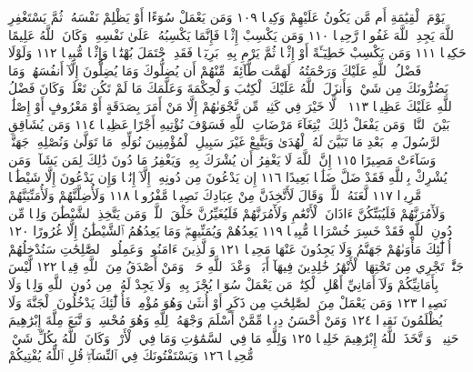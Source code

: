 يَوْمَ ٱلْقِيَٰمَةِ أَم مَّن يَكُونُ عَلَيْهِمْ وَكِيلࣰا ١٠٩ وَمَن يَعْمَلْ
سُوٓءًا أَوْ يَظْلِمْ نَفْسَهُۥ ثُمَّ يَسْتَغْفِرِ ٱللَّهَ يَجِدِ ٱللَّهَ غَفُورࣰا
رَّحِيمࣰا ١١٠ وَمَن يَكْسِبْ إِثْمࣰا فَإِنَّمَا يَكْسِبُهُۥ عَلَىٰ نَفْسِهِۦۚ
وَكَانَ ٱللَّهُ عَلِيمًا حَكِيمࣰا ١١١ وَمَن يَكْسِبْ خَطِيٓـَٔةً أَوْ إِثْمࣰا
ثُمَّ يَرْمِ بِهِۦ بَرِيٓـࣰٔا فَقَدِ ٱحْتَمَلَ بُهْتَٰنࣰا وَإِثْمࣰا مُّبِينࣰا ١١٢
وَلَوْلَا فَضْلُ ٱللَّهِ عَلَيْكَ وَرَحْمَتُهُۥ لَهَمَّت طَّآئِفَةࣱ مِّنْهُمْ
أَن يُضِلُّوكَ وَمَا يُضِلُّونَ إِلَّآ أَنفُسَهُمْۖ وَمَا يَضُرُّونَكَ
مِن شَيْءࣲۚ وَأَنزَلَ ٱللَّهُ عَلَيْكَ ٱلْكِتَٰبَ وَٱلْحِكْمَةَ وَعَلَّمَكَ
مَا لَمْ تَكُن تَعْلَمُۚ وَكَانَ فَضْلُ ٱللَّهِ عَلَيْكَ عَظِيمࣰا ١١٣
۞ لَّا خَيْرَ فِي كَثِيرࣲ مِّن نَّجْوَىٰهُمْ إِلَّا مَنْ أَمَرَ بِصَدَقَةٍ
أَوْ مَعْرُوفٍ أَوْ إِصْلَٰحِۭ بَيْنَ ٱلنَّاسِۚ وَمَن يَفْعَلْ ذَٰلِكَ
ٱبْتِغَآءَ مَرْضَاتِ ٱللَّهِ فَسَوْفَ نُؤْتِيهِ أَجْرًا عَظِيمࣰا ١١٤ وَمَن
يُشَاقِقِ ٱلرَّسُولَ مِنۢ بَعْدِ مَا تَبَيَّنَ لَهُ ٱلْهُدَىٰ وَيَتَّبِعْ غَيْرَ
سَبِيلِ ٱلْمُؤْمِنِينَ نُوَلِّهِۦ مَا تَوَلَّىٰ وَنُصْلِهِۦ جَهَنَّمَۖ وَسَآءَتْ
مَصِيرًا ١١٥ إِنَّ ٱللَّهَ لَا يَغْفِرُ أَن يُشْرَكَ بِهِۦ وَيَغْفِرُ مَا دُونَ
ذَٰلِكَ لِمَن يَشَآءُۚ وَمَن يُشْرِكْ بِٱللَّهِ فَقَدْ ضَلَّ ضَلَٰلَۢا
بَعِيدًا ١١٦ إِن يَدْعُونَ مِن دُونِهِۦٓ إِلَّآ إِنَٰثࣰا وَإِن يَدْعُونَ
إِلَّا شَيْطَٰنࣰا مَّرِيدࣰا ١١٧ لَّعَنَهُ ٱللَّهُۘ وَقَالَ لَأَتَّخِذَنَّ مِنْ
عِبَادِكَ نَصِيبࣰا مَّفْرُوضࣰا ١١٨ وَلَأُضِلَّنَّهُمْ وَلَأُمَنِّيَنَّهُمْ
وَلَأٓمُرَنَّهُمْ فَلَيُبَتِّكُنَّ ءَاذَانَ ٱلْأَنْعَٰمِ وَلَأٓمُرَنَّهُمْ
فَلَيُغَيِّرُنَّ خَلْقَ ٱللَّهِۚ وَمَن يَتَّخِذِ ٱلشَّيْطَٰنَ وَلِيࣰّا مِّن
دُونِ ٱللَّهِ فَقَدْ خَسِرَ خُسْرَانࣰا مُّبِينࣰا ١١٩ يَعِدُهُمْ
وَيُمَنِّيهِمْۖ وَمَا يَعِدُهُمُ ٱلشَّيْطَٰنُ إِلَّا غُرُورًا ١٢٠ أُو۟لَٰٓئِكَ
مَأْوَىٰهُمْ جَهَنَّمُ وَلَا يَجِدُونَ عَنْهَا مَحِيصࣰا ١٢١
وَٱلَّذِينَ ءَامَنُوا۟ وَعَمِلُوا۟ ٱلصَّٰلِحَٰتِ سَنُدْخِلُهُمْ جَنَّٰتࣲ
تَجْرِي مِن تَحْتِهَا ٱلْأَنْهَٰرُ خَٰلِدِينَ فِيهَآ أَبَدࣰاۖ وَعْدَ ٱللَّهِ
حَقࣰّاۚ وَمَنْ أَصْدَقُ مِنَ ٱللَّهِ قِيلࣰا ١٢٢ لَّيْسَ بِأَمَانِيِّكُمْ
وَلَآ أَمَانِيِّ أَهْلِ ٱلْكِتَٰبِۗ مَن يَعْمَلْ سُوٓءࣰا يُجْزَ بِهِۦ
وَلَا يَجِدْ لَهُۥ مِن دُونِ ٱللَّهِ وَلِيࣰّا وَلَا نَصِيرࣰا ١٢٣ وَمَن
يَعْمَلْ مِنَ ٱلصَّٰلِحَٰتِ مِن ذَكَرٍ أَوْ أُنثَىٰ وَهُوَ مُؤْمِنࣱ
فَأُو۟لَٰٓئِكَ يَدْخُلُونَ ٱلْجَنَّةَ وَلَا يُظْلَمُونَ نَقِيرࣰا ١٢٤ وَمَنْ
أَحْسَنُ دِينࣰا مِّمَّنْ أَسْلَمَ وَجْهَهُۥ لِلَّهِ وَهُوَ مُحْسِنࣱ وَٱتَّبَعَ
مِلَّةَ إِبْرَٰهِيمَ حَنِيفࣰاۗ وَٱتَّخَذَ ٱللَّهُ إِبْرَٰهِيمَ خَلِيلࣰا ١٢٥ وَلِلَّهِ
مَا فِي ٱلسَّمَٰوَٰتِ وَمَا فِي ٱلْأَرْضِۚ وَكَانَ ٱللَّهُ بِكُلِّ شَيْءࣲ
مُّحِيطࣰا ١٢٦ وَيَسْتَفْتُونَكَ فِي ٱلنِّسَآءِۖ قُلِ ٱللَّهُ يُفْتِيكُمْ
